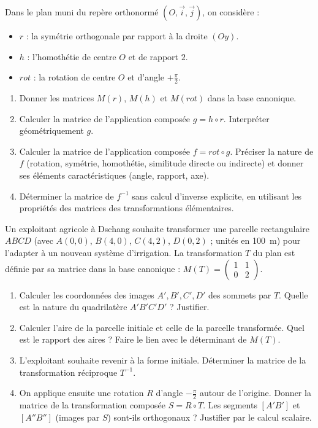 \documentclass[11pt]{article}
\begin{document}
\begin{exercice}
Dans le plan muni du repère orthonormé $(O, \vec{i}, \vec{j})$, on considère :
\begin{itemize}
    \item $r$ : la symétrie orthogonale par rapport à la droite $(Oy)$.
    \item $h$ : l'homothétie de centre $O$ et de rapport $2$.
    \item $rot$ : la rotation de centre $O$ et d'angle $+\frac{\pi}{2}$.
\end{itemize}
\begin{enumerate}
    \item Donner les matrices $M(r)$, $M(h)$ et $M(rot)$ dans la base canonique.
    \item Calculer la matrice de l'application composée $g = h \circ r$. Interpréter géométriquement $g$.
    \item Calculer la matrice de l'application composée $f = rot \circ g$. Préciser la nature de $f$ (rotation, symétrie, homothétie, similitude directe ou indirecte) et donner ses éléments caractéristiques (angle, rapport, axe).
    \item Déterminer la matrice de $f^{-1}$ sans calcul d'inverse explicite, en utilisant les propriétés des matrices des transformations élémentaires.
\end{enumerate}
\end{exercice}

\begin{exercice}
Un exploitant agricole à Dschang souhaite transformer une parcelle rectangulaire $ABCD$ (avec $A(0,0)$, $B(4,0)$, $C(4,2)$, $D(0,2)$ ; unités en \SI{100}{m}) pour l'adapter à un nouveau système d'irrigation. La transformation $T$ du plan est définie par sa matrice dans la base canonique : $M(T) = \begin{pmatrix} 1 & 1 \\ 0 & 2 \end{pmatrix}$.
\begin{enumerate}
    \item Calculer les coordonnées des images $A', B', C', D'$ des sommets par $T$. Quelle est la nature du quadrilatère $A'B'C'D'$ ? Justifier.
    \item Calculer l'aire de la parcelle initiale et celle de la parcelle transformée. Quel est le rapport des aires ? Faire le lien avec le déterminant de $M(T)$.
    \item L'exploitant souhaite revenir à la forme initiale. Déterminer la matrice de la transformation réciproque $T^{-1}$.
    \item On applique ensuite une rotation $R$ d'angle $-\frac{\pi}{2}$ autour de l'origine. Donner la matrice de la transformation composée $S = R \circ T$. Les segments $[A'B']$ et $[A''B'']$ (images par $S$) sont-ils orthogonaux ? Justifier par le calcul scalaire.
\end{enumerate}
\end{exercice}
\end{document}
